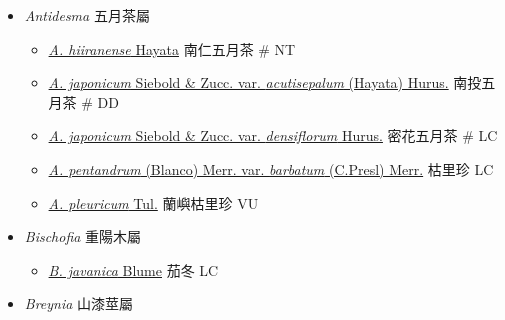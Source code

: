 
  \begin{itemize}
 \item[] \textit{Antidesma} 五月茶屬
                                
  \begin{itemize}
        \item[] \href{http://www.theplantlist.org/tpl1.1/search?q=Antidesma+hiiranense}{\textit{A. hiiranense} Hayata}   南仁五月茶  \# NT
        \item[] \href{http://www.theplantlist.org/tpl1.1/search?q=Antidesma+japonicum+var.+acutisepalum}{\textit{A. japonicum} Siebold \& Zucc. var. \textit{acutisepalum} (Hayata) Hurus.}   南投五月茶  \# DD
        \item[] \href{http://www.theplantlist.org/tpl1.1/search?q=Antidesma+japonicum+var.+densiflorum}{\textit{A. japonicum} Siebold \& Zucc. var. \textit{densiflorum} Hurus.}   密花五月茶  \# LC
        \item[] \href{http://www.theplantlist.org/tpl1.1/search?q=Antidesma+pentandrum+var.+barbatum}{\textit{A. pentandrum} (Blanco) Merr. var. \textit{barbatum} (C.Presl) Merr.}   枯里珍   LC
        \item[] \href{http://www.theplantlist.org/tpl1.1/search?q=Antidesma+pleuricum}{\textit{A. pleuricum} Tul.}   蘭嶼枯里珍   VU
  \end{itemize}
 \item[] \textit{Bischofia} 重陽木屬
                                
  \begin{itemize}
        \item[] \href{http://www.theplantlist.org/tpl1.1/search?q=Bischofia+javanica}{\textit{B. javanica} Blume}   茄冬   LC
  \end{itemize}
 \item[] \textit{Breynia} 山漆莖屬
                                

\end{itemize}

